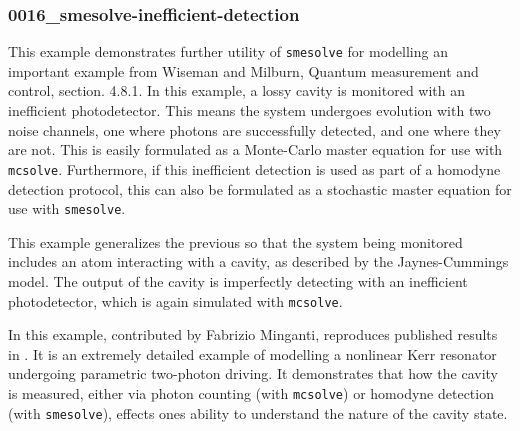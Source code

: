 \documentclass[preprint,3p,sort&compress]{elsarticle}
\def\code#1{\texttt{#1}}
\newcommand{\nocontentsline}[3]{}
\newcommand{\tocless}[2]{\bgroup\let\addcontentsline=\nocontentsline#1{#2}\egroup}
\begin{document}
\tocless\subsubsection{0016\_smesolve-inefficient-detection}

This example demonstrates further utility of \code{smesolve} for modelling an important example from Wiseman and Milburn, Quantum measurement and control, section. 4.8.1.  In this example, a lossy cavity is monitored with an inefficient photodetector. This means the system undergoes evolution with two noise channels, one where photons are successfully detected, and one where they are not.  This is easily formulated as a Monte-Carlo master equation for use with \code{mcsolve}.  Furthermore, if this inefficient detection is used as part of a homodyne detection protocol, this can also be formulated as a stochastic master equation for use with \code{smesolve}.\newline

\tocless\subsubsection{0016\_smesolve-jc-photocurrent}
This example generalizes the previous so that the system being monitored includes an atom interacting with a cavity, as described by the Jaynes-Cummings model.  The output of the cavity is imperfectly detecting with  an inefficient photodetector, which is again simulated with \code{mcsolve}.\newline

\tocless\subsubsection{0018\_measures-trajectories-cats-kerr}

In this example, contributed by Fabrizio Minganti, reproduces published results in \cite{minganti1, minganti2, minganti3}. It is an extremely detailed example of modelling a nonlinear Kerr resonator undergoing parametric two-photon driving.  It demonstrates that how the cavity is measured, either via photon counting (with \code{mcsolve}) or homodyne detection (with \code{smesolve}), effects ones ability to understand the nature of the cavity state.\newline

\tocless\subsubsection{0019\_optomechanical-steadystate}
\end{document}
